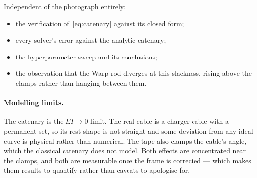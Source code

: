 \documentclass[11pt,a4paper]{article}
\begin{document}
\noindent Independent of the photograph entirely:
\begin{itemize}
  \item the verification of~\eqref{eq:catenary} against its closed form;
  \item every solver's error against the analytic catenary;
  \item the hyperparameter sweep and its conclusions;
  \item the observation that the Warp rod diverges at this slackness, rising
        above the clamps rather than hanging between them.
\end{itemize}

\paragraph{Modelling limits.} The catenary is the $EI \to 0$ limit. The real
cable is a charger cable with a permanent set, so its rest shape is not
straight and some deviation from any ideal curve is physical rather than
numerical. The tape also clamps the cable's angle, which the classical
catenary does not model. Both effects are concentrated near the clamps, and
both are measurable once the frame is corrected --- which makes them results to
quantify rather than caveats to apologise for.
\end{document}
